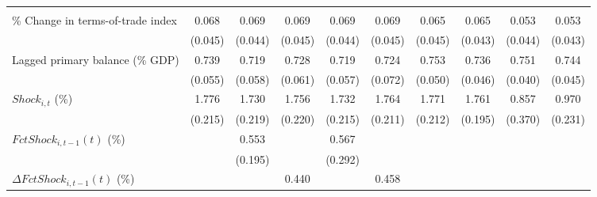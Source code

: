 {\begin{tabular}{l*{9}{c}}
                    &                     &                     &                     &                     &                     &                     &                     &                     &                     \\
\addlinespace
\% Change in terms-of-trade index&       0.068         &       0.069         &       0.069         &       0.069         &       0.069         &       0.065         &       0.065         &       0.053         &       0.053         \\
                    &     (0.045)         &     (0.044)         &     (0.045)         &     (0.044)         &     (0.045)         &     (0.045)         &     (0.043)         &     (0.044)         &     (0.043)         \\
\addlinespace
Lagged primary balance (\% GDP)&       0.739\sym{***}&       0.719\sym{***}&       0.728\sym{***}&       0.719\sym{***}&       0.724\sym{***}&       0.753\sym{***}&       0.736\sym{***}&       0.751\sym{***}&       0.744\sym{***}\\
                    &     (0.055)         &     (0.058)         &     (0.061)         &     (0.057)         &     (0.072)         &     (0.050)         &     (0.046)         &     (0.040)         &     (0.045)         \\
\addlinespace
$ Shock_{i,t}$ (\%) &       1.776\sym{***}&       1.730\sym{***}&       1.756\sym{***}&       1.732\sym{***}&       1.764\sym{***}&       1.771\sym{***}&       1.761\sym{***}&       0.857\sym{**} &       0.970\sym{***}\\
                    &     (0.215)         &     (0.219)         &     (0.220)         &     (0.215)         &     (0.211)         &     (0.212)         &     (0.195)         &     (0.370)         &     (0.231)         \\
\addlinespace
$ FctShock_{i,t-1}(t)$ (\%)&                     &       0.553\sym{**} &                     &       0.567\sym{*}  &                     &                     &                     &                     &                     \\
                    &                     &     (0.195)         &                     &     (0.292)         &                     &                     &                     &                     &                     \\
\addlinespace
$ \Delta FctShock_{i,t-1}(t)$ (\%)&                     &                     &       0.440         &                     &       0.458         &                     &                     &                     &                     \\

\end{tabular}}
